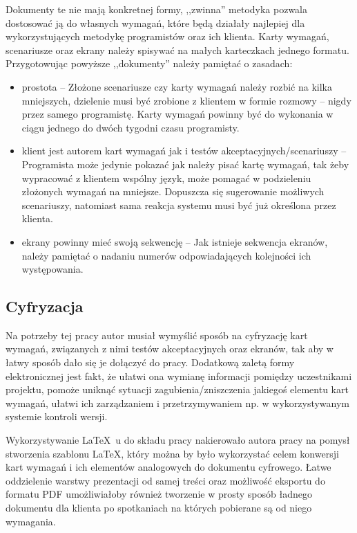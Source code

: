 Dokumenty te nie mają konkretnej formy, ,,zwinna'' metodyka pozwala dostosować ją do własnych wymagań, które będą działały najlepiej dla wykorzystujących metodykę programistów oraz ich klienta. Karty wymagań, scenariusze oraz ekrany należy spisywać na małych karteczkach jednego formatu. Przygotowując powyższe ,,dokumenty'' należy pamiętać o zasadach:
\begin{itemize}
    \item prostota -- Złożone scenariusze czy karty wymagań należy rozbić na kilka mniejszych, dzielenie musi być zrobione z klientem w formie rozmowy -- nigdy przez samego programistę. Karty wymagań powinny być do wykonania w ciągu jednego do dwóch tygodni czasu programisty.
    \item klient jest autorem kart wymagań jak i testów akceptacyjnych/scenariuszy -- Programista może jedynie pokazać jak należy pisać kartę wymagań, tak żeby wypracować z klientem wspólny język, może pomagać w podzieleniu złożonych wymagań na mniejsze. Dopuszcza się sugerowanie możliwych scenariuszy, natomiast sama reakcja systemu musi być już określona przez klienta.
    \item ekrany powinny mieć swoją sekwencję -- Jak istnieje sekwencja ekranów, należy pamiętać o nadaniu numerów odpowiadających kolejności ich występowania.
\end{itemize}

\subsection{Cyfryzacja}
\label{sec:ZSWcyfryzacja}

Na potrzeby tej pracy autor musiał wymyślić sposób na cyfryzację kart wymagań, związanych z nimi testów akceptacyjnych oraz ekranów, tak aby w łatwy sposób dało się je dołączyć do pracy. Dodatkową zaletą formy elektronicznej jest fakt, że ułatwi ona wymianę informacji pomiędzy uczestnikami projektu, pomoże uniknąć sytuacji zagubienia/zniszczenia jakiegoś elementu kart wymagań, ułatwi ich zarządzaniem i przetrzymywaniem np. w wykorzystywanym systemie kontroli wersji.

Wykorzystywanie \LaTeX~u do składu pracy nakierowało autora pracy na pomysł stworzenia szablonu \LaTeX, który można by było wykorzystać celem konwersji kart wymagań i ich elementów analogowych do dokumentu cyfrowego. Łatwe oddzielenie warstwy prezentacji od samej treści oraz możliwość eksportu do formatu PDF umożliwiałoby również tworzenie w prosty sposób ładnego dokumentu dla klienta po spotkaniach na których pobierane są od niego wymagania.

